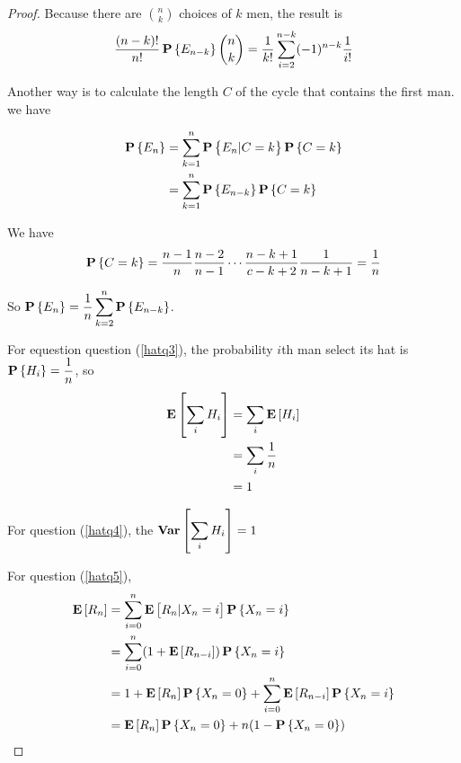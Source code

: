 \begin{proof}
    Because there are $\binom{n}{k}$ choices of $k$ men, the result is
    \begin{equation*}
        \frac{(n-k)!}{n!} \mathop{\bf P\/}\displaystyle \left\{E_{n-k}\right\} \binom{n}{k} = \frac{1}{k!} \sum_{i=2}^{n-k} (-1)^{n-k} \frac{1}{i!}
    \end{equation*}
    
    Another way is to calculate the length $C$ of the cycle that contains the first man. we have 
    
    \begin{equation*}
    \begin{aligned}
        \mathop{\bf P\/}\displaystyle \left\{E_n\right\} &= \sum_{k=1}^n \mathop{\bf P\/}\displaystyle \left\{E_n|C=k\right\} \mathop{\bf P\/}\displaystyle \left\{C=k\right\} \\
        &= \sum_{k=1}^n \mathop{\bf P\/}\displaystyle \left\{E_{n-k}\right\} \mathop{\bf P\/}\displaystyle \left\{C=k\right\}
    \end{aligned}
    \end{equation*}
    
    We have 
    \begin{equation*}
        \mathop{\bf P\/}\displaystyle \left\{C=k\right\} = \frac{n-1}{n} \frac{n-2}{n-1} \cdots \frac{n-k+1}{c-k+2} \frac{1}{n-k+1} = \frac{1}{n}
    \end{equation*}
    
    So $\displaystyle \mathop{\bf P\/}\displaystyle \left\{E_n\right\} = \frac{1}{n} \sum_{k=2}^n \mathop{\bf P\/}\displaystyle \left\{E_{n-k}\right\}$.
    
    
    
    For equestion question (\ref{hatq3}), the probability $i$th man select its hat is $\mathop{\bf P\/}\displaystyle \left\{H_i\right\} = \dfrac{1}{n}$, so 
    \begin{equation*}
        \begin{aligned}
            \mathop{\bf E\/}\displaystyle \left[ \sum_i H_i \right] &= \sum_i \mathop{\bf E\/}\displaystyle \left[ H_i \right] \\
            &= \sum_i \frac{1}{n} \\
            &= 1
        \end{aligned}
    \end{equation*}
    
    For question (\ref{hatq4}), the $\mathop{\bf Var\/}\displaystyle \left[  \sum_i H_i \right] = 1$
    
    For question (\ref{hatq5}), 
    \begin{equation*}
    \begin{aligned}
        \mathop{\bf E\/}\displaystyle \left[ R_n \right] &= \sum_{i=0}^n \mathop{\bf E\/}\displaystyle \left[ R_n | X_n = i \right] \mathop{\bf P\/}\displaystyle \left\{X_n = i\right\} \\
        &= \sum_{i=0}^n (1 + \mathop{\bf E\/}\displaystyle \left[ R_{n - i} \right]) \mathop{\bf P\/}\displaystyle \left\{X_n = i\right\} \\
        &= 1 + \mathop{\bf E\/}\displaystyle \left[ R_n \right] \mathop{\bf P\/}\displaystyle \left\{X_n = 0\right\} + \sum_{i=0}^n \mathop{\bf E\/}\displaystyle \left[ R_{n-i} \right] \mathop{\bf P\/}\displaystyle \left\{X_n=i\right\} \\
        &= \mathop{\bf E\/}\displaystyle \left[ R_n \right] \mathop{\bf P\/}\displaystyle \left\{X_n = 0\right\} + n(1 - \mathop{\bf P\/}\displaystyle \left\{X_n = 0\right\} )
    \end{aligned}
    \end{equation*}
    

\end{proof}
